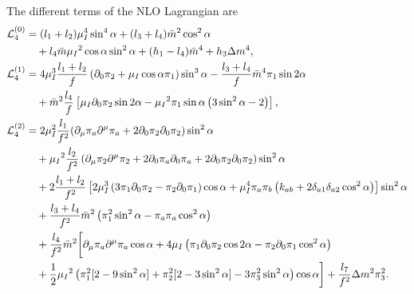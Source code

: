 The different terms of the NLO Lagrangian are
\begingroup
\allowdisplaybreaks 
%
\begin{align}
    \notag
    \Ell_4^{(0)} & =
    (l_1 + l_2)\mu_I^4 \sin^4{\alpha}
    + (l_3 + l_4)\bar m^2 \cos^2{\alpha}
    \\ &\quad
    + l_4 \bar m \mu_I{}^2 \cos{\alpha} \sin^2{\alpha}
    + (h_1 - l_4)\bar m^4
    + h_3 \Delta m^4,
    \label{NLO-L0}
    \\
    \nonumber
    \Ell_4^{(1)} & =
    4 \mu_I^3 \frac{l_1 + l_2}{f}
    \left(
        \partial_0 \pi_2 
        + \mu_I 
        \cos{\alpha} \pi_1
    \right)\sin^3{\alpha}
    -
    \frac{l_3 + l_4}{f}
    \bar m^4
    \pi_1 \sin{2\alpha}
    \\ \label{NLO-L1} & \quad
    +
    \bar m^2
    \frac{l_4}{f}
    \left[
        \mu_I 
        \partial_0 \pi_2 \sin{2\alpha}
        - \mu_I{}^2
        \pi_1 \sin{\alpha}
        \left(3\sin^2{\alpha} - 2\right)
    \right],
    \\
    \nonumber
    \Ell_4^{(2)} & = 
    2 \mu_I^2 \frac{l_1}{f^2}
    ( 
        \partial_\mu \pi_a \partial^\mu \pi_a
        + 2 \partial_0 \pi_2 \partial_0 \pi_2    
    )
        \sin^2{\alpha}
        \\ \nonumber&\quad 
    + \mu_I{}^2 
    \frac{ l_2}{f^2}
    \left(
        \partial_\mu \pi_2 \partial^\mu \pi_2
        + 2\partial_0 \pi_a\partial_0 \pi_a 
        + 2\partial_0 \pi_2 \partial_0 \pi_2
    \right) 
    \sin^2{\alpha}
    \\ \nonumber& \quad
    + 
    2 \frac{l_1 + l_2}{f^2}
    \left[
        2\mu_I^3 
        \left( 3 \pi_1 \partial_0 \pi_2 - \pi_2 \partial_0 \pi_1 \right)
        \cos{\alpha}
        + \mu_I^4  \pi_a \pi_b 
            \left(k_{ab} + 2\delta_{a1}\delta_{a2}\cos^2{\alpha} \right)
    \right]\sin^2{\alpha}
    \\ \nonumber&\quad 
    +
    \frac{l_3 + l_4}{f^2}
    \bar m^2
    \left(\pi_1^2 \sin^2{\alpha} - \pi_a \pi_a \cos^2{\alpha}\right)
    \\ \nonumber&\quad 
    + \frac{l_4}{f^2}
    \bar m^2
    \bigg[
    \partial_\mu \pi_a \partial^\mu \pi_a \cos{\alpha}
    + 4 \mu_I 
    \left(
        \pi_1 \partial_0 \pi_2 \cos{2\alpha}
        - \pi_2 \partial_0 \pi_1\cos^2{\alpha}
    \right)
    \\ & \quad %
    +\frac{1}{2} \mu_I{}^2
    \left(                
        \pi_1^2[2 - 9 \sin^2{\alpha}]
        + \pi_2^2 [2 - 3 \sin^2{\alpha}]
        - 3\pi_3^2\sin^2{\alpha}
    \right)
    \cos{\alpha}
    \bigg]
    + \frac{l_7}{f^2}
    \Delta m^2 \pi_3^2.
    \label{NLO-L2}
\end{align}
%
\endgroup

